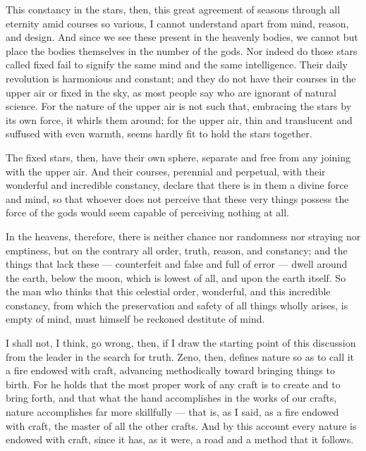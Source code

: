  This constancy in the stars, then, this great agreement of seasons through all eternity amid courses so various, I cannot understand apart from mind, reason, and design. And since we see these present in the heavenly bodies, we cannot but place the bodies themselves in the number of the gods. Nor indeed do those stars called fixed fail to signify the same mind and the same intelligence. Their daily revolution is harmonious and constant; and they do not have their courses in the upper air or fixed in the sky, as most people say who are ignorant of natural science. For the nature of the upper air is not such that, embracing the stars by its own force, it whirls them around; for the upper air, thin and translucent and suffused with even warmth, seems hardly fit to hold the stars together.

 The fixed stars, then, have their own sphere, separate and free from any joining with the upper air. And their courses, perennial and perpetual, with their wonderful and incredible constancy, declare that there is in them a divine force and mind, so that whoever does not perceive that these very things possess the force of the gods would seem capable of perceiving nothing at all.

 In the heavens, therefore, there is neither chance nor randomness nor straying nor emptiness, but on the contrary all order, truth, reason, and constancy; and the things that lack these — counterfeit and false and full of error — dwell around the earth, below the moon, which is lowest of all, and upon the earth itself. So the man who thinks that this celestial order, wonderful, and this incredible constancy, from which the preservation and safety of all things wholly arises, is empty of mind, must himself be reckoned destitute of mind.

 I shall not, I think, go wrong, then, if I draw the starting point of this discussion from the leader in the search for truth. Zeno, then, defines nature so as to call it a fire endowed with craft, advancing methodically toward bringing things to birth. For he holds that the most proper work of any craft is to create and to bring forth, and that what the hand accomplishes in the works of our crafts, nature accomplishes far more skillfully — that is, as I said, as a fire endowed with craft, the master of all the other crafts. And by this account every nature is endowed with craft, since it has, as it were, a road and a method that it follows.


